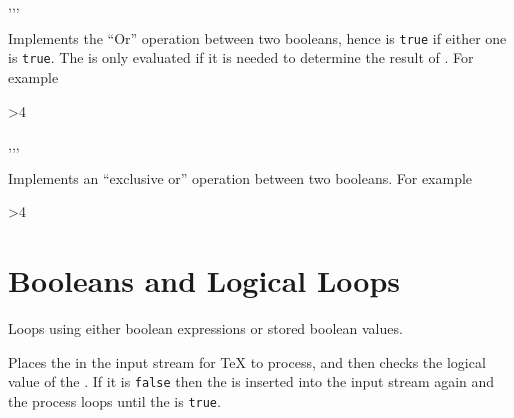 \documentclass[oneside]{book}
\begin{document}
\begin{function}{\BoolVarOr,\BoolVarOrT,\BoolVarOrF,\BoolVarOrTF}
\begin{syntax}
  
   
   
    
\end{syntax}
Implements the \enquote{Or} operation between two booleans,
hence is \texttt{true} if either one is \texttt{true}.
The  is only evaluated if it is needed to determine the result of
.
For example
\begin{demohigh}
 {>{4}} {} {}
\end{demohigh}
\end{function}

\begin{function}{\BoolVarXor,\BoolVarXorT,\BoolVarXorF,\BoolVarXorTF}
\begin{syntax}
  
   
   
    
\end{syntax}
Implements an \enquote{exclusive or} operation between two booleans.
For example
\begin{demohigh}
 {>{4}} {} {}
\end{demohigh}
\end{function}

\section{Booleans and Logical Loops}

Loops using either boolean expressions or stored boolean values.

\begin{function}{\BoolVarDoUntil}
\begin{syntax}
  
\end{syntax}
Places the  in the input stream for \TeX{} to process,
and then checks the logical value of the .  If it is
\texttt{false} then the  is inserted into the input
stream again and the process loops until the  is
\texttt{true}.
\begin{demohigh}
\IgnoreSpacesOn
\BoolSetFalse \lTmpaBool
\IntZero \lTmpaInt
\ClistClear \lTmpaClist
\BoolVarDoUntil {}
\ClistVarJoin \lTmpaClist {:}
\IgnoreSpacesOff
\end{demohigh}
\end{function}
\end{document}

